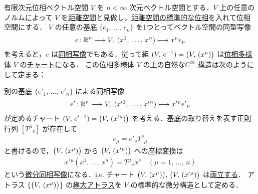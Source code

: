 \documentclass[geometry_main]{subfiles}
\begin{document}
\begin{myexample}[label=ex:diffmani-finvec]{有限次元位相ベクトル空間}
	$V$ を $n < \infty$ 次元ベクトル空間とする．$V$ 上の任意のノルムによって $V$ を\hyperref[def.metric-space]{距離空間}と見做し，\hyperref[thm.metrictopo]{距離空間の標準的な位相}を入れて位相空間にする．
	$V$ の任意の基底 $\{e_1,\, \dots,\, e_n\}$ を1つとってベクトル空間の同型写像
	\begin{align}
		e \colon \mathbb{R}^n \longrightarrow V,\; (x^1,\, \dots,\, x^n) \longmapsto x^\mu e_\mu
	\end{align}
	を考えると，$e$ は\hyperref[def.homeo]{同相写像}でもある．従って組 $(V,\, e^{-1}) = \bigl(V,\, (x^\mu)\bigr)$ は\hyperref[def.topomani]{位相多様体} $V$ の\hyperref[def.localcoord]{チャート}になる．
	この位相多様体 $V$ の上の自然な\hyperref[diffmani]{$C^\infty$ 構造}は次のようにして定まる：
	
	別の基底 $\{e'{}_1,\, \dots,\, e'{}_n\}$ による同相写像
	\begin{align}
		e' \colon \mathbb{R}^n \longrightarrow V,\; (x'{}^1,\, \dots,\, x'{}^n) \longmapsto x'{}^\mu e'{}_\mu
	\end{align}
	が定めるチャート $(V,\, e'{}^{-1}) = \bigl(V,\, (x'{}^\mu)\bigr)$ を考える．基底の取り替えを表す正則行列 $[T^\mu{}_\nu]$ が存在して
	\begin{align}
		e_\mu = e'{}_{\nu}T^{\nu}{}_{\mu}
	\end{align}
	と書けるので，$\bigl(V,\, (x^\mu)\bigr)$ から $\bigl(V,\, (x'{}^\mu)\bigr)$ への座標変換は
	\begin{align}
		x'{}^\mu (x^1,\, \dots ,\, x^n) = T^{\mu}{}_\nu x^\nu\quad (\mu = 1,\, \dots,\, n)
	\end{align}
	という\hyperref[def.diffeomo]{微分同相写像}になる．i.e. チャート $\bigl(V,\, (x^\mu)\bigr),\, \bigl(V,\, (x'{}^\mu)\bigr)$ は\hyperref[manieq]{両立する}．
	アトラス $\{\bigl(V,\, (x^\mu)\bigr)\}$ の\hyperref[maxatlas]{極大アトラス}を $V$ の標準的な微分構造として定める．
\end{myexample}
\end{document}

